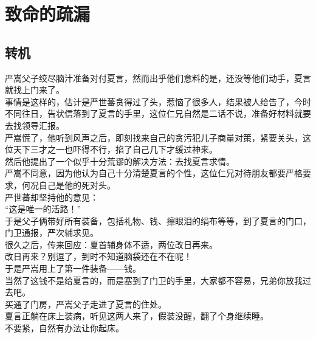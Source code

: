 \section{致命的疏漏}
\ifnum{}
	\begin{multicols}{\theparacolNo}
\fi
\subsection{转机}
严嵩父子绞尽脑汁准备对付夏言，然而出乎他们意料的是，还没等他们动手，夏言就找上门来了。\\

事情是这样的，估计是严世蕃贪得过了头，惹恼了很多人，结果被人给告了，今时不同往日，告状信落到了夏言的手里，这位仁兄自然是二话不说，准备好材料就要去找领导汇报。\\

严嵩慌了，他听到风声之后，即刻找来自己的贪污犯儿子商量对策，紧要关头，这位天下三才之一也吓得不行，掐了自己几下才缓过神来。\\

然后他提出了一个似乎十分荒谬的解决方法：去找夏言求情。\\

严嵩不同意，因为他认为自己十分清楚夏言的个性，这位仁兄对待朋友都要严格要求，何况自己是他的死对头。\\

严世蕃却坚持他的意见：\\

“这是唯一的活路！”\\

于是父子俩带好所有装备，包括礼物、钱、擦眼泪的绢布等等，到了夏言的门口，门卫通报，严次辅求见。\\

很久之后，传来回应：夏首辅身体不适，两位改日再来。\\

改日再来？别逗了，到时不知道脑袋还在不在呢！\\

于是严嵩用上了第一件装备——钱。\\

当然了这钱不是给夏言的，而是塞到了门卫的手里，大家都不容易，兄弟你放我过去吧。\\

买通了门房，严嵩父子走进了夏言的住处。\\

夏言正躺在床上装病，听见这两人来了，假装没醒，翻了个身继续睡。\\

不要紧，自然有办法让你起床。\\


\end{multicols}
